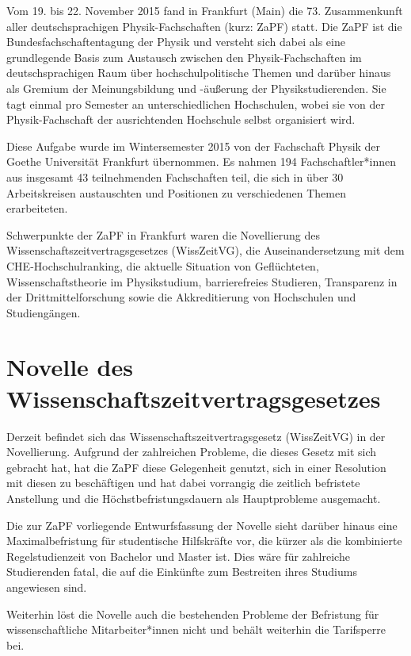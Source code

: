 Vom 19. bis 22. November 2015 fand in Frankfurt (Main) die 73. Zusammenkunft
aller deutschsprachigen Physik-Fachschaften (kurz: ZaPF) statt.  Die ZaPF ist
die Bundesfachschaftentagung der Physik und versteht sich dabei als eine
grundlegende Basis zum Austausch zwischen den Physik-Fachschaften im
deutschsprachigen Raum über hochschulpolitische Themen und darüber hinaus als
Gremium der Meinungsbildung und -äußerung der Physikstudierenden. Sie tagt
einmal pro Semester an unterschiedlichen Hochschulen, wobei sie von der
Physik-Fachschaft der ausrichtenden Hochschule selbst organisiert wird.

Diese Aufgabe wurde im Wintersemester 2015 von der Fachschaft Physik der Goethe
Universität Frankfurt übernommen. Es nahmen 194 Fachschaftler*innen aus
insgesamt 43 teilnehmenden Fachschaften teil, die sich in über 30 Arbeitskreisen
austauschten und Positionen zu verschiedenen Themen erarbeiteten.

Schwerpunkte der ZaPF in Frankfurt waren die Novellierung des
Wissenschaftszeitvertragsgesetzes (WissZeitVG), die Auseinandersetzung mit dem
CHE-Hochschulranking, die aktuelle Situation von Geflüchteten,
Wissenschaftstheorie im Physikstudium, barrierefreies Studieren, Transparenz in
der Drittmittelforschung sowie die Akkreditierung von Hochschulen und
Studiengängen.

\newpage

\section*{Novelle des Wissenschaftszeitvertragsgesetzes}
Derzeit befindet sich das Wissenschaftszeitvertragsgesetz (WissZeitVG) in der
Novellierung. Aufgrund der zahlreichen Probleme, die dieses Gesetz mit sich
gebracht hat, hat die ZaPF diese Gelegenheit genutzt, sich in einer Resolution
mit diesen zu beschäftigen und hat dabei  vorrangig die zeitlich befristete
Anstellung und die Höchstbefristungsdauern als Hauptprobleme ausgemacht.

Die zur ZaPF vorliegende Entwurfsfassung der Novelle sieht darüber hinaus eine
Maximalbefristung für studentische Hilfskräfte vor, die kürzer als die
kombinierte Regelstudienzeit von Bachelor und Master ist. Dies wäre für
zahlreiche Studierenden fatal, die auf die Einkünfte zum Bestreiten ihres
Studiums angewiesen sind.

Weiterhin löst die Novelle auch die bestehenden Probleme der Befristung für
wissenschaftliche Mitarbeiter*innen nicht und behält weiterhin die Tarifsperre bei.

